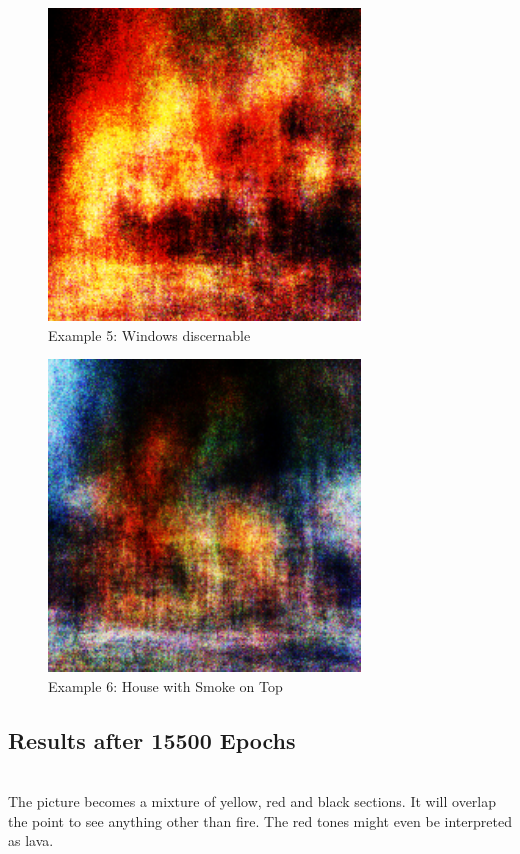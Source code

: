     \begin{figure}[htb!] 
    	\centering
    	\includegraphics[width=0.7\linewidth]{10000-2.pdf}
    	\caption{Example 5: Windows discernable}
    	\label{fig:10000-2}
    \end{figure}

    \begin{figure}[htb!] 
    	\centering
    	\includegraphics[width=0.7\linewidth]{10000-3.pdf}
    	\caption{Example 6: House with Smoke on Top}
    	\label{fig:10000-2}
    \end{figure}


    \subsection{Results after 15500 Epochs}\\    
    The picture becomes a mixture of yellow, red and black sections. It will overlap the point to see anything other than fire. The red tones might even be interpreted as lava.

